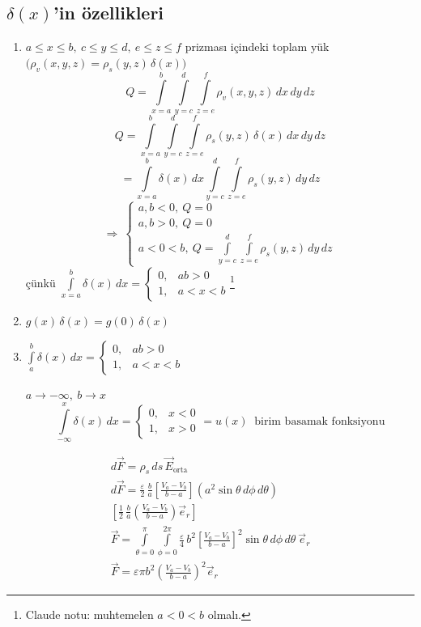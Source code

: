 \documentclass[11pt,a4paper]{article}
\begin{document}
\subsection{$\delta(x)$'in özellikleri}
\begin{enumerate}
\item $a\le x\le b,\ c\le y\le d,\ e\le z\le f$ prizması içindeki toplam yük $\bigl(\rho_v(x,y,z)=\rho_s(y,z)\,\delta(x)\bigr)$
\[ Q=\int\limits_{x=a}^{b}\int\limits_{y=c}^{d}\int\limits_{z=e}^{f}\rho_v(x,y,z)\,dx\,dy\,dz \]
\[ Q=\int\limits_{x=a}^{b}\int\limits_{y=c}^{d}\int\limits_{z=e}^{f}\rho_s(y,z)\,\delta(x)\,dx\,dy\,dz \]
\[ =\int\limits_{x=a}^{b}\delta(x)\,dx\int\limits_{y=c}^{d}\int\limits_{z=e}^{f}\rho_s(y,z)\,dy\,dz \]
\[ \Rightarrow\ \begin{cases} a,b<0,\ Q=0\\ a,b>0,\ Q=0\\ a<0<b,\ Q=\displaystyle\int\limits_{y=c}^{d}\int\limits_{z=e}^{f}\rho_s(y,z)\,dy\,dz\end{cases} \]
çünkü $\displaystyle\int\limits_{x=a}^{b}\delta(x)\,dx=\begin{cases}0, & ab>0\\ 1, & a<x<b\end{cases}$\footnote{Claude notu: muhtemelen $a<0<b$ olmalı.}
\item $g(x)\,\delta(x)=g(0)\,\delta(x)$
\item $\displaystyle\int\limits_{a}^{b}\delta(x)\,dx=\begin{cases}0, & ab>0\\ 1, & a<x<b\end{cases}$

$a\to-\infty,\ b\to x$
\[ \int\limits_{-\infty}^{x}\delta(x)\,dx=\begin{cases}0, & x<0\\ 1, & x>0\end{cases}=u(x)\ \text{ birim basamak fonksiyonu} \]
\end{enumerate}

\begin{gather*}
d\vec F=\rho_s\,ds\,\vec E_{\mathrm{orta}}\\
d\vec F=\frac{\varepsilon}{2}\,\frac{b}{a}\left[\frac{V_a-V_b}{b-a}\right]\left(a^2\sin\theta\,d\phi\,d\theta\right)\\
\left[\frac12\,\frac{b}{a}\left(\frac{V_a-V_b}{b-a}\right)\vec e_r\right]\\
\vec F=\int\limits_{\theta=0}^{\pi}\int\limits_{\phi=0}^{2\pi}\frac{\varepsilon}{4}\,b^2\left[\frac{V_a-V_b}{b-a}\right]^{2}\sin\theta\,d\phi\,d\theta\ \vec e_r\\
\vec F=\varepsilon\pi b^2\left(\frac{V_a-V_b}{b-a}\right)^{2}\vec e_r
\end{gather*}
\end{document}
